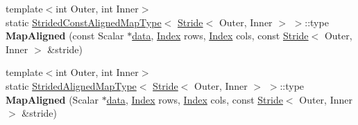 \begin{Indent}
\begin{DoxyCompactItemize}
\item 
\mbox{\label{class_eigen_1_1_plain_object_base_a48fbb5cbf164540617c5ca3e05afe953}} 
{\footnotesize template$<$int Outer, int Inner$>$ }\\static \hyperlink{struct_eigen_1_1_plain_object_base_1_1_strided_const_aligned_map_type}{Strided\+Const\+Aligned\+Map\+Type}$<$ \hyperlink{group___core___module_class_eigen_1_1_stride}{Stride}$<$ Outer, Inner $>$ $>$\+::type {\bfseries Map\+Aligned} (const Scalar $\ast$\hyperlink{class_eigen_1_1_plain_object_base_ac25699535374b1854cf8494e44ad31b2}{data}, \hyperlink{namespace_eigen_a62e77e0933482dafde8fe197d9a2cfde}{Index} rows, \hyperlink{namespace_eigen_a62e77e0933482dafde8fe197d9a2cfde}{Index} cols, const \hyperlink{group___core___module_class_eigen_1_1_stride}{Stride}$<$ Outer, Inner $>$ \&stride)
\item 
\mbox{\label{class_eigen_1_1_plain_object_base_af2ce47a0cde3943e528e00f2b191f7da}} 
{\footnotesize template$<$int Outer, int Inner$>$ }\\static \hyperlink{struct_eigen_1_1_plain_object_base_1_1_strided_aligned_map_type}{Strided\+Aligned\+Map\+Type}$<$ \hyperlink{group___core___module_class_eigen_1_1_stride}{Stride}$<$ Outer, Inner $>$ $>$\+::type {\bfseries Map\+Aligned} (Scalar $\ast$\hyperlink{class_eigen_1_1_plain_object_base_ac25699535374b1854cf8494e44ad31b2}{data}, \hyperlink{namespace_eigen_a62e77e0933482dafde8fe197d9a2cfde}{Index} rows, \hyperlink{namespace_eigen_a62e77e0933482dafde8fe197d9a2cfde}{Index} cols, const \hyperlink{group___core___module_class_eigen_1_1_stride}{Stride}$<$ Outer, Inner $>$ \&stride)
\end{DoxyCompactItemize}
\end{Indent}
